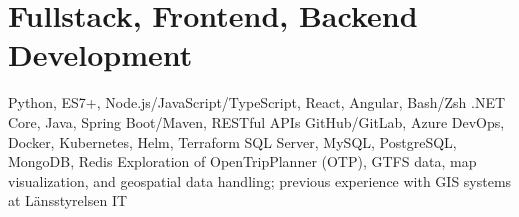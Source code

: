 \section{Fullstack, Frontend, Backend Development}
  {Python, ES7+, Node.js/JavaScript/TypeScript, React, Angular, Bash/Zsh}
 {.NET Core, Java, Spring Boot/Maven, RESTful APIs}
 {GitHub/GitLab, Azure DevOps, Docker, Kubernetes, Helm, Terraform}
 {SQL Server, MySQL, PostgreSQL, MongoDB, Redis}
 {Exploration of OpenTripPlanner (OTP), GTFS data, map visualization, and geospatial data handling; previous experience with GIS systems at Länsstyrelsen IT}
